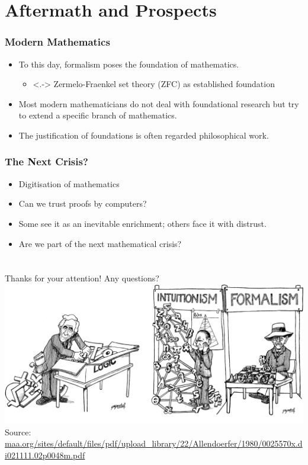 \documentclass{beamer}
\begin{document}
\section{Aftermath and Prospects}
\begin{frame}
    \frametitle{Modern Mathematics}
    \begin{itemize}[<+->]
	\item To this day, formalism poses the foundation of mathematics.
	\begin{itemize}
		\item<.-> Zermelo-Fraenkel set theory (ZFC) as established foundation
	\end{itemize}
	\item Most modern mathematicians do not deal with foundational research but try to extend a specific branch of mathematics.
	\item The justification of foundations is often regarded philosophical work.
    \end{itemize}
\end{frame}
\begin{frame}
    \frametitle{The Next Crisis?}
    \begin{itemize}[<+->]
	\item Digitisation of mathematics
	\item Can we trust proofs by computers?
	\item Some see it as an inevitable enrichment; others face it with distrust.
	\item Are we part of the next mathematical crisis?
    \end{itemize}
\end{frame}
\section*{}
\begin{frame}
	\center
	\Large{Thanks for your attention! Any questions?}
	\vspace{0.5\baselineskip}\\
	\includegraphics[height=0.6\textheight]{img/logic_intuit_form2.png}\\
	\scriptsize{Source: \url{maa.org/sites/default/files/pdf/upload\_library/22/Allendoerfer/1980/0025570x.di021111.02p0048m.pdf}}
\end{frame}

\newpage


\end{document}
